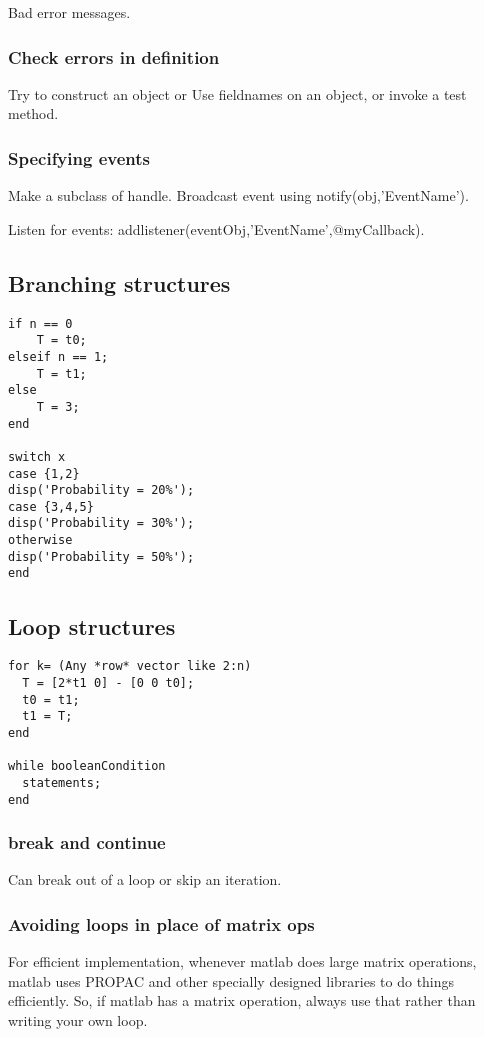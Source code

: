 \documentclass[oneside, article]{memoir}
\begin{document}
Bad error messages.

\subsubsection{Check errors in definition}
Try to construct an object or Use fieldnames on an object, or invoke a test method.

\subsubsection{Specifying events}
Make a subclass of handle. Broadcast event using notify(obj,'EventName').

Listen for events: addlistener(eventObj,'EventName',@myCallback).

\subsection{Branching structures}
\begin{verbatim}
if n == 0
    T = t0;
elseif n == 1;
    T = t1;
else
    T = 3;
end

switch x
case {1,2}
disp('Probability = 20%');
case {3,4,5}
disp('Probability = 30%');
otherwise
disp('Probability = 50%');
end
\end{verbatim}

\subsection{Loop structures}
\begin{verbatim}
for k= (Any *row* vector like 2:n)
  T = [2*t1 0] - [0 0 t0];
  t0 = t1;
  t1 = T;
end

while booleanCondition
  statements;
end
\end{verbatim}

\subsubsection{break and continue}
Can break out of a loop or skip an iteration.

\subsubsection{Avoiding loops in place of matrix ops}
For efficient implementation, whenever matlab does large matrix operations, matlab uses PROPAC and other specially designed libraries to do things efficiently. So, if matlab has a matrix operation, always use that rather than writing your own loop.
\end{document}
